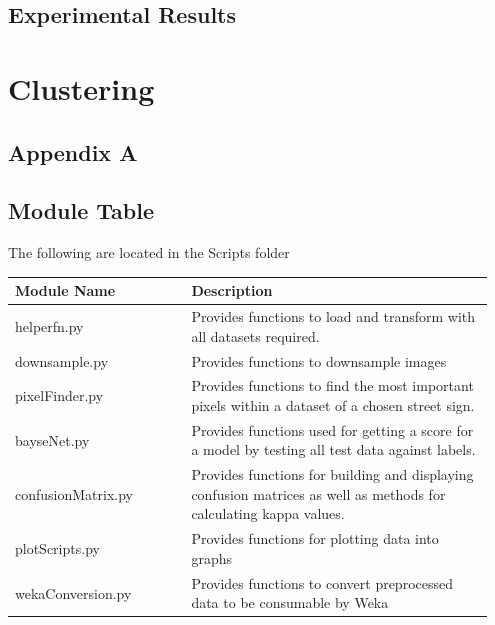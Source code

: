 \documentclass[11pt]{article}
\begin{document}
\subsection{Experimental Results}


\pagebreak

\section{Clustering}

\pagebreak
\appendix
\appendixpage
\addappheadtotoc
\begin{appendices}
\section{Appendix A}
\subsection{Module Table}\label{tab:moduleTable}
The following are located in the Scripts folder
\begin{table}[ht]
    \centering
    \begin{tabular}{|p{0.35\linewidth} | p{0.6\linewidth}|} 
      \hline
      \textbf{Module Name}  & \textbf{Description} \\ \hline
      helperfn.py & Provides functions to load and transform with all datasets required. \\ \hline
      downsample.py & Provides functions to downsample images  \\ \hline
      pixelFinder.py & Provides functions to find the most important pixels within a dataset of a chosen street sign. \\ \hline
      bayseNet.py & Provides functions used for getting a score for a model by testing all test data against labels. \\ \hline
      confusionMatrix.py & Provides functions for building and displaying confusion matrices as well as methods for calculating kappa values. \\ \hline
      plotScripts.py & Provides functions for plotting data into graphs \\ \hline
      wekaConversion.py & Provides functions to convert preprocessed data to be consumable by Weka\\
      \hline
    \end{tabular}
\end{table}

\newpage

\end{appendices}
\end{document}
